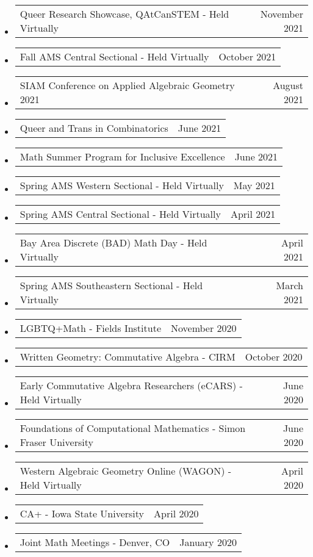 \documentclass[letterpaper,11pt]{article}
\makeatletter
\newcommand{\ressubheadingTalk}[2]{
\begin{tabular*}{6.5in}[t]{l@{\cftdotfill{\cftsecdotsep}\extracolsep{\fill}}r}
		#1 & #2 \\
\end{tabular*}\vspace{-6pt}}
\makeatother
\begin{document}
\begin{itemize}
\item
	\ressubheadingTalk{Queer Research Showcase, QAtCanSTEM  - Held Virtually}{November 2021}
	
\item
	\ressubheadingTalk{Fall AMS Central Sectional - Held Virtually}{October 2021}
	
\item
	\ressubheadingTalk{SIAM Conference on Applied Algebraic Geometry 2021}{August 2021}

\item
	\ressubheadingTalk{Queer and Trans in Combinatorics}{June 2021}
		
\item
	\ressubheadingTalk{Math Summer Program for Inclusive Excellence}{June 2021}
	
\item
	\ressubheadingTalk{Spring AMS Western Sectional - Held Virtually}{May 2021}

\item
	\ressubheadingTalk{Spring AMS Central Sectional - Held Virtually}{April 2021}
	
\item
	\ressubheadingTalk{Bay Area Discrete (BAD) Math Day - Held Virtually}{April 2021}
	
\item
	\ressubheadingTalk{Spring AMS Southeastern Sectional - Held Virtually}{March 2021}
	
\item
	\ressubheadingTalk{LGBTQ+Math - Fields Institute}{November 2020}

\item
	\ressubheadingTalk{Written Geometry: Commutative Algebra - CIRM}{October 2020}\footnotemark[2]
		
\item
	\ressubheadingTalk{Early Commutative Algebra Researchers (eCARS) - Held Virtually}{June 2020}

\item
	\ressubheadingTalk{Foundations of Computational Mathematics - Simon Fraser University}{June 2020}\footnotemark[2]

\item
	\ressubheadingTalk{Western Algebraic Geometry Online (WAGON) - Held Virtually}{April 2020}
	
\item
	\ressubheadingTalk{CA+ - Iowa State University}{April 2020}\footnotemark[2]

\item
	\ressubheadingTalk{Joint Math Meetings - Denver, CO}{January 2020}
	

\end{itemize}
\end{document}
